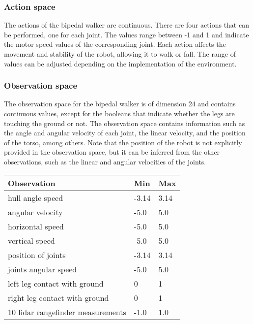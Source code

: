 \subsubsection{Action space}
The actions of the bipedal walker are continuous. There are four actions that can be performed, one for each joint. The values range between -1 and 1 and indicate the motor speed values of the corresponding joint. Each action affects the movement and stability of the robot, allowing it to walk or fall. The range of values can be adjusted depending on the implementation of the environment.

\subsubsection{Observation space}
The observation space for the bipedal walker is of dimension 24 and contains continuous values, except for the booleans that indicate whether the legs are touching the ground or not. The observation space contains information such as the angle and angular velocity of each joint, the linear velocity, and the position of the torso, among others.
Note that the position of the robot is not explicitly provided in the observation space, but it can be inferred from the other observations, such as the linear and angular velocities of the joints.

\begin{table}[!ht]
\centering
\begin{tabular}{|l|l|l|}
\hline
\textbf{Observation} & \textbf{Min} & \textbf{Max} \\
\hline
hull angle speed                    & -3.14 & 3.14 \\
\hline
angular velocity                    & -5.0  & 5.0  \\
\hline
horizontal speed                    & -5.0  & 5.0  \\
\hline
vertical speed                      & -5.0  & 5.0  \\
\hline
position of joints                  & -3.14 & 3.14 \\
\hline
joints angular speed                & -5.0  & 5.0  \\
\hline
left leg contact with ground        & 0     & 1    \\
\hline
right leg contact with ground       & 0     & 1    \\
\hline
10 lidar rangefinder measurements   & -1.0  & 1.0  \\
\hline

\end{tabular}
\end{table}

